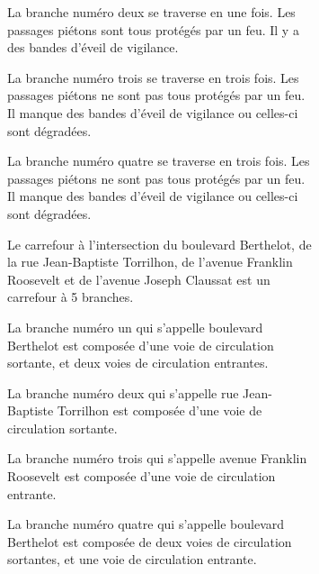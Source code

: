 \begin{figure}
\begin{subfigure}[t]{\linewidth}
\begin{minipage}[t]{0.49\linewidth}
            \vspace{5pt}

            La branche numéro deux se traverse en une fois. Les passages piétons sont tous protégés par un feu. Il y a des bandes d'éveil de vigilance.
            
            \vspace{5pt}

            La branche numéro trois se traverse en trois fois. Les passages piétons ne sont pas tous protégés par un feu. Il manque des bandes d'éveil de vigilance ou celles-ci sont dégradées.

            \vspace{5pt}

            La branche numéro quatre se traverse en trois fois. Les passages piétons ne sont pas tous protégés par un feu. Il manque des bandes d'éveil de vigilance ou celles-ci sont dégradées.
        \end{minipage}
        \begin{minipage}[t]{0.49\linewidth}
            \vspace{0pt}
            \scriptsize
            Le carrefour à l'intersection du boulevard Berthelot, de la rue Jean-Baptiste Torrilhon, de l'avenue Franklin Roosevelt et de l'avenue Joseph Claussat est un carrefour à 5 branches.

            \vspace{5pt}

            La branche numéro un qui s'appelle boulevard Berthelot est composée d'une voie de circulation sortante, et deux voies de circulation entrantes.

            \vspace{5pt}

            La branche numéro deux qui s'appelle rue Jean-Baptiste Torrilhon est composée d'une voie de circulation sortante.

            \vspace{5pt}

            La branche numéro trois qui s'appelle avenue Franklin Roosevelt est composée d'une voie de circulation entrante.

            \vspace{5pt}

            La branche numéro quatre qui s'appelle boulevard Berthelot est composée de deux voies de circulation sortantes, et une voie de circulation entrante.

            \vspace{5pt}


\end{minipage}
\end{subfigure}
\end{figure}
